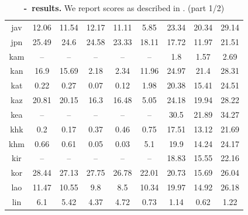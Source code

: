 \begin{table}[htb]
\begin{tabular}{@{}ccccccccc@{}}
        jav & 12.06 & 11.54 & 12.17 & 11.11 & 5.85 & 23.34 & 20.34 & 29.14 \\
        jpn & 25.49 & 24.6 & 24.58 & 23.33 & 18.11 & 17.72 & 11.97 & 21.51 \\
        kam & -- & -- & -- & -- & -- & 1.8 & 1.57 & 2.69 \\
        kan & 16.9 & 15.69 & 2.18 & 2.34 & 11.96 & 24.97 & 21.4 & 28.31 \\
        kat & 0.22 & 0.27 & 0.07 & 0.12 & 1.98 & 20.38 & 15.41 & 24.51 \\
        kaz & 20.81 & 20.15 & 16.3 & 16.48 & 5.05 & 24.18 & 19.94 & 28.22 \\
        kea & -- & -- & -- & -- & -- & 30.5 & 21.89 & 34.27 \\
        khk & 0.2 & 0.17 & 0.37 & 0.46 & 0.75 & 17.51 & 13.12 & 21.69 \\
        khm & 0.66 & 0.61 & 0.05 & 0.03 & 5.1 & 19.9 & 14.24 & 24.17 \\
        kir & -- & -- & -- & -- & -- & 18.83 & 15.55 & 22.16 \\
        kor & 28.44 & 27.13 & 27.75 & 26.78 & 22.01 & 20.73 & 15.69 & 26.04 \\
        lao & 11.47 & 10.55 & 9.8 & 8.5 & 10.34 & 19.97 & 14.92 & 26.18 \\
        lin & 6.1 & 5.42 & 4.37 & 4.72 & 0.73 & 1.14 & 0.62 & 1.22 \\
        \bottomrule
    \end{tabular}
    \caption{\textbf{\fleurs-\sst~\xeng results.} We report \asrbleu scores as described in . (part 1/2)}\label{tbl:fleurs:sst:xeng:p1}
\end{table}

